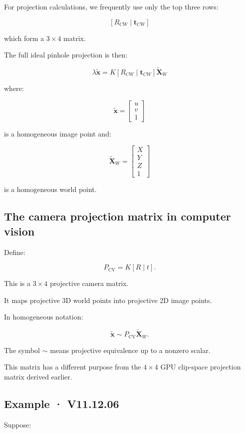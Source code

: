 For projection calculations, we frequently use only the top three rows:

\[
 \boxed{ [R_{CW}\mid\mathbf t_{CW}] }
\]

which form a \(3\times4\) matrix.

The full ideal pinhole projection is then:

\[
 \boxed{ \lambda\tilde{\mathbf x} = K[R_{CW}\mid\mathbf t_{CW}] \tilde{\mathbf X}_W }
\]

where:

\[
 \tilde{\mathbf x}= \begin{bmatrix}u\\v\\1\end{bmatrix}
\]

is a homogeneous image point and:

\[
 \tilde{\mathbf X}_W= \begin{bmatrix}X\\Y\\Z\\1\end{bmatrix}
\]

is a homogeneous world point.

\subsection{The camera projection matrix in computer vision}\label{02-foundations-ii-ch035-the-camera-projection-matrix-in-computer-vision}

\hypertarget{02-foundations-ii-ch035-the-camera-projection-matrix-in-computer-vision}{}

Define:

\[
 \boxed{ P_{\mathrm{CV}}=K[R\mid t] }.
\]

This is a \(3\times4\) projective camera matrix.

It maps projective 3D world points into projective 2D image points.

In homogeneous notation:

\[
 \boxed{ \tilde{\mathbf x}\sim P_{\mathrm{CV}}\tilde{\mathbf X}_W }.
\]

The symbol \(\sim\) means projective equivalence up to a nonzero scalar.

This matrix has a different purpose from the \(4\times4\) GPU clip-space projection matrix derived earlier.

\begin{allmightroleexample}

\subsection{Example · V11.12.06}\label{02-foundations-ii-ch035-example-v11.12.06}

\hypertarget{02-foundations-ii-ch035-example-v11.12.06}{}

Suppose:

\end{allmightroleexample}

